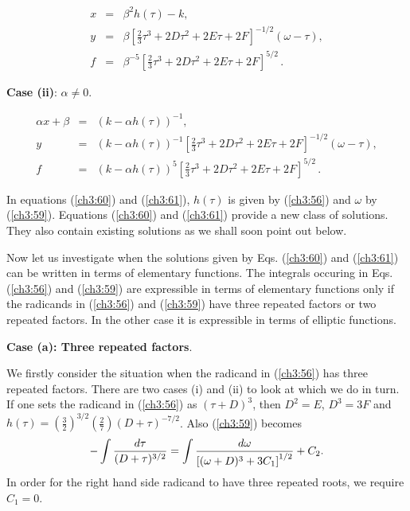 \begin{equation}\label{ch3:60}
\begin{array}{lll}  x &= & \beta^2 h(\tau) -k,\\
y&=&\beta[\frac23\tau^3+2D\tau^2+2E\tau+2F]^{-1/2}(\omega-\tau),\\
f&=&\beta^{-5}[\frac23\tau^3+2D\tau^2+2E\tau+2F]^{5/2}\,.
\end{array}
\end{equation}

{\bf Case (ii)}: $\alpha\ne0$.

 \begin{equation}\label{ch3:61}
\begin{array}{lll} \alpha x+\beta &= & (k-\alpha h(\tau))^{-1},\\
y&=&(k-\alpha h(\tau))^{-1}[\frac23\tau^3+2D\tau^2+2E\tau+2F]^{-1/2}(\omega-\tau),\\
f&=&(k-\alpha h(\tau))^{5}[\frac23\tau^3+2D\tau^2+2E\tau+2F]^{5/2}\,.
\end{array}
\end{equation}

In equations (\ref{ch3:60}) and (\ref{ch3:61}), $h(\tau)$ is given by (\ref{ch3:56}) and $\omega$ by (\ref{ch3:59}).
Equations (\ref{ch3:60}) and (\ref{ch3:61}) provide a new class of solutions. They also contain existing
solutions as we shall soon point out below.

Now let us investigate when the solutions given by Eqs. (\ref{ch3:60}) and (\ref{ch3:61}) can be written in
terms of elementary functions.  The integrals occuring in Eqs. (\ref{ch3:56}) and (\ref{ch3:59}) are
expressible in terms of elementary functions only if the radicands in (\ref{ch3:56}) and (\ref{ch3:59})
have three repeated factors or two repeated factors.
In the other case it is expressible in terms of elliptic functions. 

{\bf Case (a): Three repeated factors}.

We firstly consider the situation when the radicand in (\ref{ch3:56}) has three repeated factors. There are two
cases (i) and (ii) to look at which we do in turn. If one sets the radicand in (\ref{ch3:56}) as $(\tau+D)^3$, then
$D^2=E$, $D^3=3F$ and  $h(\tau)=\left(\frac32\right)^{3/2}\left(\frac27\right)(D+\tau)^{-7/2}$.  Also
(\ref{ch3:59}) becomes
\begin{equation}
-\int {d\tau\over (D+\tau)^{3/2}}=\int {d\omega\over \left [ (\omega+D)^3
+3C_1\right]^{1/2}}+C_2.\label{ch3:63}
\end{equation}
In order for the right hand side radicand to have three repeated roots, we require $C_1=0$.

